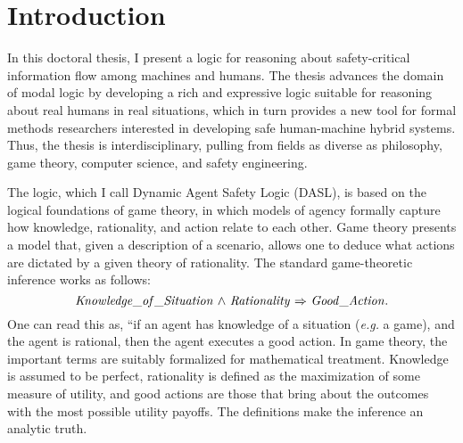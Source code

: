 \chapter{Introduction}
	\label{CH_Intro}

In this doctoral thesis, I present a logic for reasoning about safety-critical information flow among machines and humans. The thesis advances the domain of modal logic by developing a rich and expressive logic suitable for reasoning about real humans in real situations, which in turn provides a new tool for formal methods researchers interested in developing safe human-machine hybrid systems. Thus, the thesis is interdisciplinary, pulling from fields as diverse as philosophy, game theory, computer science, and safety engineering.  
%

The logic, which I call Dynamic Agent Safety Logic (DASL), is based on the logical foundations of game theory, in which models of agency formally capture how knowledge, rationality, and action relate to each other. Game theory presents a model that, given a description of a scenario, allows one to deduce what actions are dictated by a given theory of rationality. The standard game-theoretic inference works as follows:
\begin{equation*}
\mathit{Knowledge\_of\_Situation} {\ \wedge \ } \mathit{Rationality} {\ \Rightarrow \ } \mathit{Good\_Action}.
\end{equation*}
One can read this as, ``if an agent has knowledge of a situation (\emph{e.g.} a game), and the agent is rational, then the agent executes a good action. In game theory, the important terms are suitably formalized for mathematical treatment. Knowledge is assumed to be perfect, rationality is defined as the maximization of some measure of utility, and good actions are those that bring about the outcomes with the most possible utility payoffs. The definitions make the inference an analytic truth.

